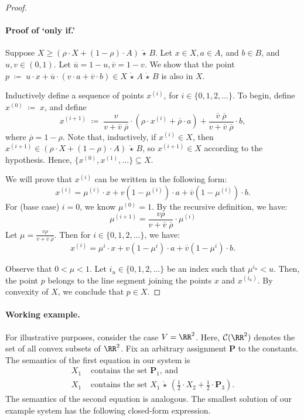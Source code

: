 \documentclass[10pt]{amsart}
\theoremstyle{plain}
\theoremstyle{definition}
\providecommand{\cC}[0]{\ensuremath{\mathcal C}\xspace}
\providecommand{\bP}[0]{\ensuremath{\mathbf P}\xspace}
\let\geq\geqslant
\providecommand{\defeq}[0]{\ensuremath{\;\coloneqq\;}\xspace}
\providecommand{\p}[1]{\ensuremath{^{\left(#1\right)}}\xspace}
\providecommand{\cmult}[0]{\ensuremath{{\,\mathring{\star}\,}}\xspace}
\begin{document}
\begin{proof}
\paragraph{Proof of `only if.'} Suppose $X\geq (\rho\cdot X + (1-\rho)\cdot A)\cmult B$. 
Let $x\in X, a\in A$, and $b\in B$, and 
$u,v\in (0,1)$. Let $\overline{u}=1-u, \overline{v}=1-v$. We show that the point $p\defeq u\cdot x+ \overline{u}\cdot (v\cdot a+\overline{v}\cdot b)\in X\cmult A\cmult B$ is 
also in $X$. 

Inductively define a sequence of points $x\p i$, for $i\in \{0,1,2,\dots\}$. To begin, define $x\p 0\defeq x$, and define
$$x\p {i+1}\defeq \frac{v}{v+\overline{v}\;\overline{\rho}}\cdot \left(\rho\cdot x\p i+\overline{\rho}\cdot a\right)+\frac{\overline{v}\;\overline{\rho}}{v+\overline{v}\;\overline{\rho}}\cdot b,
$$
where $\overline{\rho}=1-\rho$. Note that, inductively, if $x\p i\in X$, then $x\p {i+1}\in (\rho\cdot X + (1-\rho)\cdot A)\cmult B$, so 
$x\p {i+1}\in X$ according to the hypothesis. Hence, $\{x\p 0,x\p 1,\dots\}\subseteq X$. 

We will prove that $x\p i$ can be written in the following form: 
    $$x\p i=\mu \p i\cdot x+v(1-\mu \p i)\cdot a+\overline{v}(1-\mu \p i)\cdot b.$$
For (base case) $i=0$, we know $\mu\p 0=1$. By the recursive definition, we have:
$$\mu \p {i+1}=\frac{v\rho}{v+\overline{v}\;\overline{\rho}}\cdot \mu\p i$$
Let $\mu=\frac{v\rho}{v+\overline{v}\;\overline{\rho}}$. Then 
for $i\in \{0,1,2,\dots\}$, we have:
$$x\p i=\mu ^ i\cdot x+v(1-\mu ^ i)\cdot a+\overline{v}(1-\mu ^ i)\cdot b.$$

Observe that $0 < \mu <1$. 
Let $i_u\in\{0,1,2,\dotsc\}$ be an index such that $\mu^{i_u}<u$. 
Then, the point $p$ belongs to the line segment joining the points $x$ and $x\p{i_u}$. 
By convexity of $X$, we conclude that $p\in X$.
\end{proof}







\paragraph{Working example.}
For illustrative purposes, consider 
the case $V = \RR^2$.
Here, 
$\cC(\RR^2)$
denotes the set of all convex subsets of $\RR^2$. 
Fix an arbitrary assignment $\bP$ to the constants. 
The semantics of the first equation in our system is 
\begin{align*}
    X_1 &\text{ contains the set } \bP_1 \text{, and }\\
    X_1 &\text{ contains the set } X_1 \cmult \left(\frac12\cdot X_2 + \frac12\cdot \bP_3\right).
\end{align*}
The semantics of the second equation is analogous. 
The smallest solution of our example system has the following closed-form expression. 
\end{document}
